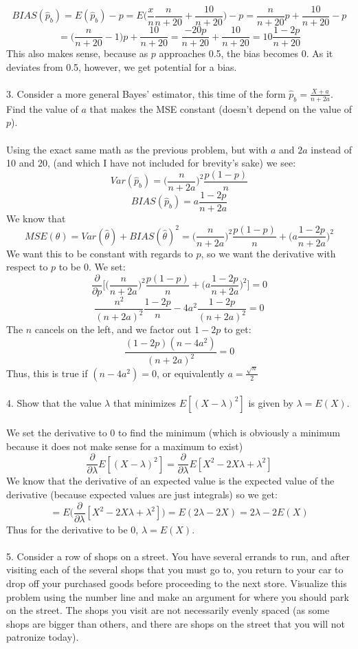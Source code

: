 \documentclass{article}
\begin{document}
$$BIAS(\hat p_b) = E(\hat p_b) - p = E\bigg(\frac{x}{n}\frac{n}{n+20}+\frac{10}{n+20}\bigg) - p = \frac{n}{n+20}p + \frac{10}{n+20} - p$$
$$= \bigg(\frac{n}{n+20} - 1\bigg)p +\frac{10}{n+20} = \frac{-20p}{n+20} + \frac{10}{n+20} = 10 \frac{1-2p}{n+20}$$
This also makes sense, because as $p$ approaches 0.5, the bias becomes 0. As it deviates from 0.5, however, we get potential for a bias.
\\\\3.  Consider a more general Bayes' estimator, this time of the form $\hat{p}_b = \frac{X + a}{n + 2a}$.  Find the value of $a$ that makes the MSE constant (doesn't depend on the value of $p$).\\\\
Using the exact same math as the previous problem, but with $a$ and $2a$ instead of 10 and 20, (and which I have not included for brevity's sake) we see:
$$Var(\hat p_b) = \bigg(\frac{n}{n+2a}\bigg)^2 \frac{p(1-p)}{n}$$
$$BIAS(\hat p_b) = a \frac{1-2p}{n+2a}$$
We know that 
$$MSE(\theta)=Var(\hat{\theta}) + BIAS(\hat{\theta})^2=\bigg(\frac{n}{n+2a}\bigg)^2 \frac{p(1-p)}{n}+\bigg(a \frac{1-2p}{n+2a}\bigg)^2$$
We want this to be constant with regards to $p$, so we want the derivative with respect to $p$ to be 0. We set:
$$\frac{\partial}{\partial p} \Bigg[\bigg(\frac{n}{n+2a}\bigg)^2 \frac{p(1-p)}{n}+\bigg(a \frac{1-2p}{n+2a}\bigg)^2\bigg] = 0$$
$$\frac{n^2}{(n+2a)^2} \frac{1-2p}{n} - 4a^2 \frac{1-2p}{(n+2a)^2} = 0$$
The $n$ cancels on the left, and we factor out $1-2p$ to get:
$$\frac{(1-2p) (n - 4a^2)}{(n+2a)^2} = 0$$
Thus, this is true if $(n - 4a^2) = 0$, or equivalently $a = \frac{\sqrt{n}}{2}$
\\\\4.  Show that the value $\lambda$ that minimizes $E[(X-\lambda)^2]$ is given by $\lambda=E(X)$.
\\\\We set the derivative to 0 to find the minimum (which is obviously a minimum because it does not make sense for a maximum to exist)
$$\frac{\partial}{\partial \lambda}E[(X-\lambda)^2] = \frac{\partial}{\partial \lambda}E[X^2-2X\lambda + \lambda^2]$$
We know that the derivative of an expected value is the expected value of the derivative (because expected values are just integrals) so we get:
$$=E\bigg(\frac{\partial}{\partial \lambda}[X^2-2X\lambda + \lambda^2]\bigg) = E(2\lambda - 2X) = 2\lambda - 2E(X)$$
Thus for the derivative to be 0, $\lambda = E(X)$.
\\\\5.  Consider a row of shops on a street.  You have several errands to run, and after visiting each of the several shops that you must go to, you return to your car to drop off your purchased goods before proceeding to the next store.   Visualize this problem using the number line and make an argument for where you should park on the street.  The shops you visit are not necessarily evenly spaced (as some shops are bigger than others, and there are shops on the street that you will not patronize today).     
\end{document}
